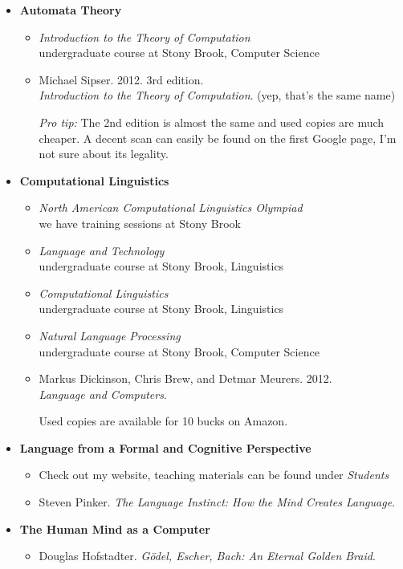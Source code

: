 \begin{itemize}
    \item \textbf{Automata Theory}
        \begin{itemize}
            \item \emph{Introduction to the Theory of Computation}\\
                undergraduate course at Stony Brook, Computer Science
            \item Michael Sipser. 2012. 3rd edition.\\
                \emph{Introduction to the Theory of Computation}. (yep, that's the same name)

                \smallskip
                \emph{Pro tip:} The 2nd edition is almost the same and used copies are much cheaper.
                A decent scan can easily be found on the first Google page, I'm not sure about its legality.
        \end{itemize}
    \item \textbf{Computational Linguistics}
        \begin{itemize}
            \item \emph{North American Computational Linguistics Olympiad}\\
                we have training sessions at Stony Brook
            \item \emph{Language and Technology}\\
                undergraduate course at Stony Brook, Linguistics
            \item \emph{Computational Linguistics}\\
                undergraduate course at Stony Brook, Linguistics
            \item \emph{Natural Language Processing}\\
                undergraduate course at Stony Brook, Computer Science
            \item Markus Dickinson, Chris Brew, and Detmar Meurers. 2012.\\
                \emph{Language and Computers}.

                \smallskip
                Used copies are available for 10 bucks on Amazon.
        \end{itemize}
    \item \textbf{Language from a Formal and Cognitive Perspective}
        \begin{itemize}
            \item Check out my website, teaching materials can be found under \emph{Students}
            \item Steven Pinker. \emph{The Language Instinct: How the Mind Creates Language}.
        \end{itemize}
    \item \textbf{The Human Mind as a Computer}
        \begin{itemize}
            \item Douglas Hofstadter. \emph{Gödel, Escher, Bach: An Eternal Golden Braid}.
        \end{itemize}
\end{itemize}

